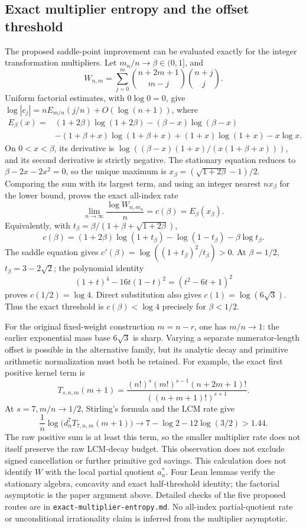 \documentclass[11pt]{article}
\theoremstyle{remark}
\begin{document}
\subsection{Exact multiplier entropy and the offset threshold}
The proposed saddle-point improvement can be evaluated exactly for the
integer transformation multipliers. Let \(m_n/n\to\beta\in(0,1]\), and
\[
 W_{n,m}=\sum_{j=0}^m
 \binom{n+2m+1}{m-j}\binom{n+j}{j}.
\]
Uniform factorial estimates, with \(0\log0=0\), give
\(\log|c_j|=nE_{m/n}(j/n)+O(\log(n+1))\), where
\begin{align*}
 E_\beta(x)={}&(1+2\beta)\log(1+2\beta)
 -(\beta-x)\log(\beta-x)\\
 &-(1+\beta+x)\log(1+\beta+x)
 +(1+x)\log(1+x)-x\log x.
\end{align*}
On \(0<x<\beta\), its derivative is
\(\log((\beta-x)(1+x)/(x(1+\beta+x)))\), and its second derivative
is strictly negative. The stationary equation reduces to
\(\beta-2x-2x^2=0\), so the unique maximum is
\(x_\beta=(\sqrt{1+2\beta}-1)/2\). Comparing the sum with its largest
term, and using an integer nearest \(nx_\beta\) for the lower bound,
proves the exact all-index rate
\[
 \lim_{n\to\infty}\frac{\log W_{n,m_n}}n=c(\beta)=E_\beta(x_\beta).
\]
Equivalently, with \(t_\beta=\beta/(1+\beta+\sqrt{1+2\beta})\),
\[
 c(\beta)=(1+2\beta)\log(1+t_\beta)
 -\log(1-t_\beta)-\beta\log t_\beta.
\]
The saddle equation gives
\(c'(\beta)=\log((1+t_\beta)^2/t_\beta)>0\).
At \(\beta=1/2\), \(t_\beta=3-2\sqrt2\); the polynomial identity
\[
 (1+t)^4-16t(1-t)^2=(t^2-6t+1)^2
\]
proves \(c(1/2)=\log4\). Direct substitution also gives
\(c(1)=\log(6\sqrt3)\). Thus the exact threshold is
\(c(\beta)<\log4\) precisely for \(\beta<1/2\).

For the original fixed-weight construction \(m=n-r\), one has
\(m/n\to1\): the earlier exponential mass base \(6\sqrt3\) is sharp.
Varying a separate numerator-length offset is possible in the alternative
family, but its analytic decay and primitive arithmetic normalization
must both be retained. For example, the exact first positive kernel term is
\[
 T_{s,n,m}(m+1)=
 \frac{(n!)^s(m!)^{s-1}(n+2m+1)!}{((n+m+1)!)^{s+1}}.
\]
At \(s=7,m/n\to1/2\), Stirling's formula and the LCM rate give
\[
 \frac1n\log\bigl(d_n^7 T_{7,n,m}(m+1)\bigr)
 \longrightarrow7-\log2-12\log(3/2)>1.44.
\]
The raw positive sum is at least this term, so the smaller multiplier
rate does not itself preserve the raw LCM-decay budget. This observation
does not exclude signed cancellation or further primitive gcd savings.
This calculation does not identify \(W\) with
the local partial quotient \(a_n^*\). Four Lean lemmas verify the
stationary algebra, concavity and exact half-threshold identity; the
factorial asymptotic is the paper argument above. Detailed checks of the
five proposed routes are in \texttt{exact-multiplier-entropy.md}.
No all-index partial-quotient rate or unconditional irrationality claim
is inferred from the multiplier asymptotic.
\end{document}
